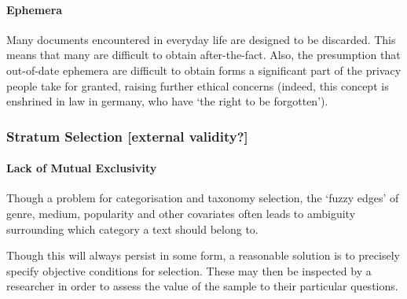 \paragraph{Ephemera}
Many documents encountered in everyday life are designed to be discarded. This means that many are difficult to obtain after-the-fact.  Also, the presumption that out-of-date ephemera are difficult to obtain forms a significant part of the privacy people take for granted, raising further ethical concerns (indeed, this concept is enshrined in law in germany, who have `the right to be forgotten').


\sepline



\subsubsection{Stratum Selection [external validity?]}



\paragraph{Lack of Mutual Exclusivity}
Though a problem for categorisation and taxonomy selection, the `fuzzy edges' of genre, medium, popularity and other covariates often leads to ambiguity surrounding which category a text should belong to.

Though this will always persist in some form, a reasonable solution is to precisely specify objective conditions for selection. These may then be inspected by a researcher in order to assess the value of the sample to their particular questions.

